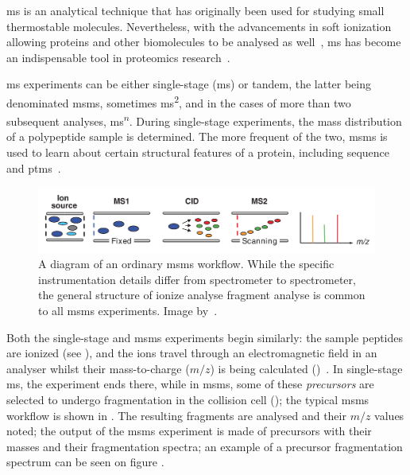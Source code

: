 \Gls*{ms} is an analytical technique that has originally been used for studying small thermostable molecules. Nevertheless, with the advancements in soft ionization allowing proteins and other biomolecules to be analysed as well~\cite{fenn1989electrospray}, \gls*{ms} has become an indispensable tool in proteomics research~\cite{collins2003human}.

\Gls*{ms} experiments can be either single-stage (\gls*{ms}) or tandem, the latter being denominated \gls*{msms}, sometimes \gls*{ms}\textsuperscript{2}, and in the cases of more than two subsequent analyses, \gls*{ms}\textsuperscript{\(n\)}. During single-stage experiments, the mass distribution of a polypeptide sample is determined. The more frequent of the two, \gls*{msms} is used to learn about certain structural features of a protein, including sequence and \glspl*{ptm}~\cite{domon2006mass}.

\begin{figure}
  \centering
  \includegraphics[width=.9\linewidth]{img/msms-workflow.png}
  \caption{A diagram of an ordinary \gls*{msms} workflow. While the specific instrumentation details differ from spectrometer to spectrometer, the general structure of ionize \textrightarrow{} analyse \textrightarrow{} fragment \textrightarrow{} analyse is common to all \gls*{msms} experiments. Image by~\citet{domon2006mass}.}\label{fig:mass-spectrometry-workflow}
\end{figure}

Both the single-stage and \gls*{msms} experiments begin similarly: the sample peptides are ionized (see ), and the ions travel through an electromagnetic field in an analyser whilst their mass-to-charge (\(m/z\)) is being calculated ()~\cite{gross2006mass}. In single-stage \gls*{ms}, the experiment ends there, while in \gls*{msms}, some of these \emph{precursors} are selected to undergo fragmentation in the collision cell (); the typical \gls*{msms} workflow is shown in . The resulting fragments are analysed and their \(m/z\) values noted; the output of the \gls*{msms} experiment is made of precursors with their masses and their fragmentation spectra; an example of a precursor fragmentation spectrum can be seen on figure .

